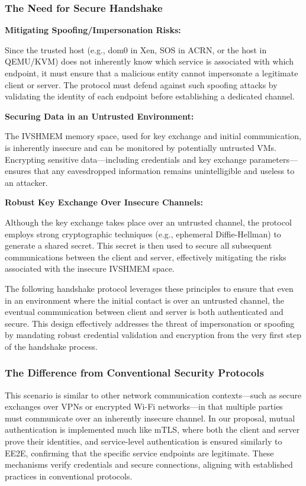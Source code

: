 \documentclass[conference]{IEEEtran}
\begin{document}
\subsubsection{The Need for Secure Handshake}


\textbf{Mitigating Spoofing/Impersonation Risks:}

Since the trusted host (e.g., dom0 in Xen, SOS in ACRN, or the host in QEMU/KVM) does not inherently know which service is associated with which endpoint, it must ensure that a malicious entity cannot impersonate a legitimate client or server. The protocol must defend against such spoofing attacks by validating the identity of each endpoint before establishing a dedicated channel.
    
\textbf{Securing Data in an Untrusted Environment:}

The IVSHMEM memory space, used for key exchange and initial communication, is inherently insecure and can be monitored by potentially untrusted VMs. Encrypting sensitive data—including credentials and key exchange parameters—ensures that any eavesdropped information remains unintelligible and useless to an attacker.
    
\textbf{Robust Key Exchange Over Insecure Channels:}

Although the key exchange takes place over an untrusted channel, the protocol employs strong cryptographic techniques (e.g., ephemeral Diffie-Hellman) to generate a shared secret. This secret is then used to secure all subsequent communications between the client and server, effectively mitigating the risks associated with the insecure IVSHMEM space.


The following handshake protocol leverages these principles to ensure that even in an environment where the initial contact is over an untrusted channel, the eventual communication between client and server is both authenticated and secure. This design effectively addresses the threat of impersonation or spoofing by mandating robust credential validation and encryption from the very first step of the handshake process.





\subsubsection{The Difference from Conventional Security Protocols}

This scenario is similar to other network communication contexts—such as secure exchanges over VPNs or encrypted Wi-Fi networks—in that multiple parties must communicate over an inherently insecure channel. In our proposal, mutual authentication is implemented much like mTLS, where both the client and server prove their identities, and service-level authentication is ensured similarly to EE2E, confirming that the specific service endpoints are legitimate. These mechanisms verify credentials and secure connections, aligning with established practices in conventional protocols.
\end{document}

